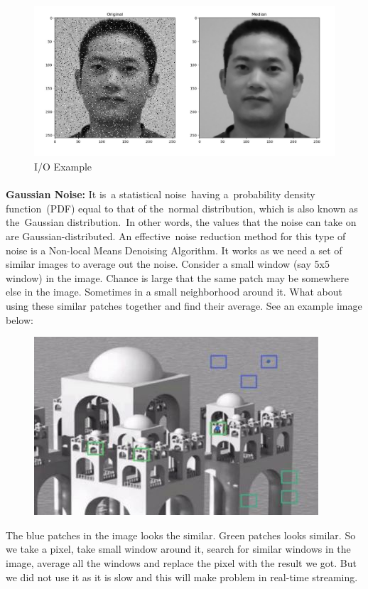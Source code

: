 \begin{figure}[H]
	\centering
	\includegraphics[width=\linewidth]{salt_pepper.jpg}
	\caption{I/O Example}
\end{figure}

\paragraph{}
\textbf{Gaussian Noise:}\newline
It is a statistical noise having a probability density function (PDF) equal to that of the normal distribution, which is also known as the Gaussian distribution. In other words, the values that the noise can take on are Gaussian-distributed.\newline
An effective noise reduction method for this type of noise is a Non-local Means Denoising Algorithm.\newline
It works as we need a set of similar images to average out the noise. Consider a small window (say 5x5 window) in the image. Chance is large that the same patch may be somewhere else in the image. Sometimes in a small neighborhood around it. What about using these similar patches together and find their average.\newline
See an example image below:\newline
\begin{figure}[H]
	\centering
	\includegraphics[width=\linewidth]{nlmd.jpg}
\end{figure}
The blue patches in the image looks the similar. Green patches looks similar. So we take a pixel, take small window around it, search for similar windows in the image, average all the windows and replace the pixel with the result we got.\newline
But we did not use it as it is slow and this will make problem in real-time streaming.


